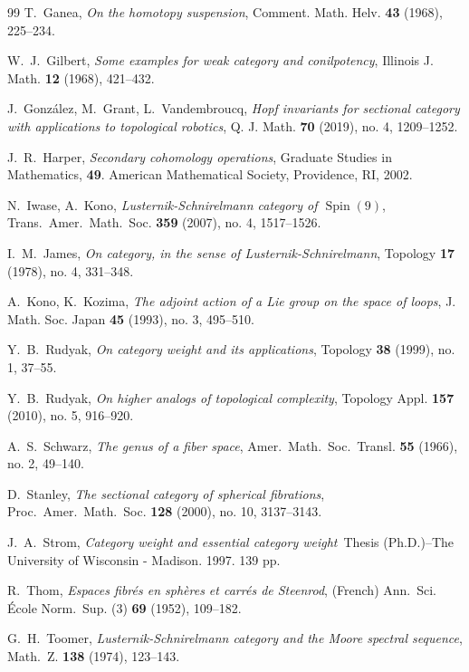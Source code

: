 \documentclass{amsart}
\theoremstyle{plain}
\theoremstyle{definition}
\begin{document}
\begin{thebibliography}{99}
 T.\ Ganea, {\em On the homotopy suspension}, Comment. Math. Helv. {\bf 43} (1968), 225--234.

 W.\ J.\ Gilbert, {\em Some examples for weak category and conilpotency}, Illinois J. Math. {\bf 12} (1968), 421--432.

 J.\ Gonz\'{a}lez, M.\ Grant, L.\ Vandembroucq, \emph{Hopf invariants for sectional category with applications to topological robotics}, Q. J. Math. {\bf 70} (2019), no. 4, 1209--1252.

 J.\ R.\ Harper, \emph{Secondary cohomology operations}, Graduate Studies in Mathematics, {\bf 49}. American Mathematical Society, Providence, RI, 2002.

 N.\ Iwase, A.\ Kono, \emph{Lusternik-Schnirelmann category of $\operatorname{Spin}(9)$}, Trans.\ Amer.\ Math.\ Soc. {\bf 359} (2007), no. 4, 1517--1526.

 I.\ M.\ James, \emph{On category, in the sense of Lusternik-Schnirelmann}, Topology {\bf 17} (1978), no. 4, 331--348.

 A.\ Kono, K.\ Kozima, {\em The adjoint action of a Lie group on the space of loops}, J. Math. Soc. Japan {\bf 45} (1993), no. 3, 495--510.

 Y.\ B.\ Rudyak, \emph{On category weight and its applications}, Topology {\bf 38} (1999), no. 1, 37--55.
 
 Y.\ B.\ Rudyak, \emph{On higher analogs of topological complexity}, Topology Appl. {\bf 157} (2010), no. 5, 916--920.

 A.\ S.\ Schwarz,  \emph{The genus of a fiber space},
 Amer.\ Math.\ Soc.\ Transl.  {\bf 55} (1966), no. 2, 49--140.

 D.\ Stanley, \emph{The sectional category of spherical fibrations}, Proc.\ Amer.\ Math.\ Soc. {\bf 128} (2000), no. 10, 3137--3143.

 J.\ A.\ Strom, \emph{Category weight and essential category weight}\, Thesis (Ph.D.)–The University of Wisconsin - Madison. 1997. 139 pp.
 
 R.\ Thom, \emph{Espaces fibr\'{e}s en sph\`{e}res et carr\'{e}s de Steenrod}, (French) Ann.\ Sci. \'{E}cole Norm.\ Sup. (3) {\bf 69} (1952), 109--182.

 G.\ H.\ Toomer, \emph{Lusternik-Schnirelmann category and the Moore spectral sequence}, Math.\ Z. {\bf 138} (1974), 123--143.

\end{thebibliography}
\end{document}
